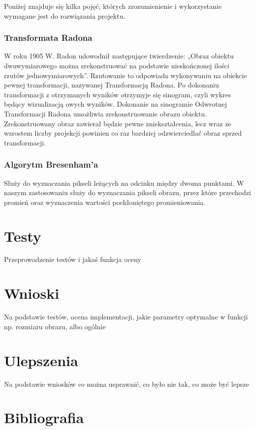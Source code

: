 \documentclass[A_4paper,12pt]{article}
\begin{document}
Poniżej znajduje się kilka pojęć, których zrozumienienie i wykorzystanie wymagane jest do rozwiązania projektu.
\subsubsection{Transformata Radona}
W roku 1905 W. Radon udowodnił następujące twierdzenie: „Obraz obiektu dwuwymiarowego można zrekonstruować na podstawie nieskończonej ilości rzutów jednowymiarowych”. Rzutowanie to odpowiada wykonywaniu na obiekcie pewnej transformacji, nazywanej Transformacją Radona.
Po dokonaniu transformacji z otrzymanych wyników otrzymyje się sinogram, czyli wykres będący wizualizacją owych wyników.
Dokonanie na sinogramie Odwrotnej Transformacji Radona umożliwia zrekonstruowanie obrazu obiektu. Zrekonstruowany obraz zawierał będzie pewne zniekształcenia, lecz wraz ze wzrostem liczby projekcji powinien co raz bardziej odzwierciedlać obraz sprzed transformacji.

\subsubsection{Algorytm Bresenham'a}
Służy do wyznaczania pikseli leżących na odcinku między dwoma punktami. W naszym zastosowaniu służy do wyznaczania pikseli obrazu, przez które przechodzi promień oraz wyznaczenia wartości pochłoniętego promieniowania.

\section{Testy}
Przeprowadzenie testów i jakaś funkcja oceny

\section{Wnioski}
Na podstawie testów, ocena implementacji, jakie parametry optymalne w funkcji np. rozmiaru obrazu, albo ogólnie

\section{Ulepszenia}
Na podstawie wniosków co można usprawnić, co było nie tak, co może być lepsze

\section{Bibliografia}


\end{document}
